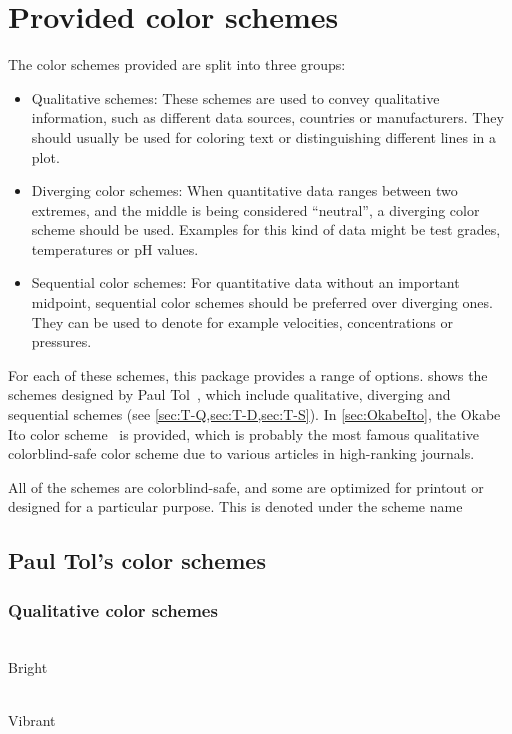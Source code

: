 \documentclass{scrartcl}
\begin{document}
\section{Provided color schemes}\label{sec:colors}
The color schemes provided are split into three groups:
\begin{itemize}
    \item Qualitative schemes:\newline
        These schemes are used to convey qualitative information, such as different data sources, countries or manufacturers.
        They should usually be used for coloring text or distinguishing different lines in a plot.
    \item Diverging color schemes:\newline
        When quantitative data ranges between two extremes, and the middle is being considered ``neutral'', a diverging color scheme should be used.
        Examples for this kind of data might be test grades, temperatures or pH values.
    \item Sequential color schemes:\newline
        For quantitative data without an important midpoint, sequential color schemes should be preferred over diverging ones.
        They can be used to denote for example velocities, concentrations or pressures.
\end{itemize}

For each of these schemes, this package provides a range of options.
 shows the schemes designed by Paul Tol~\cite{Tol}, which include qualitative, diverging and sequential schemes (see \cref{sec:T-Q,sec:T-D,sec:T-S}).
In \cref{sec:OkabeIto}, the Okabe Ito color scheme~\cite{Ichihara_2008} is provided, which is probably the most famous qualitative colorblind-safe color scheme due to various articles in high-ranking journals.

All of the schemes are colorblind-safe, and some are optimized for printout or designed for a particular purpose.
This is denoted under the scheme name

\subsection{Paul Tol's color schemes}\label{sec:Tol_schemes}

\subsubsection{Qualitative color schemes}\label{sec:T-Q}
\begin{minipage}{0.5\textwidth}
    \centering
    \\
    Bright\\
    \phantom{pb}
\end{minipage}\hfill%
\begin{minipage}{0.5\textwidth}
    \centering
    \\
    Vibrant
\end{minipage}
\end{document}
